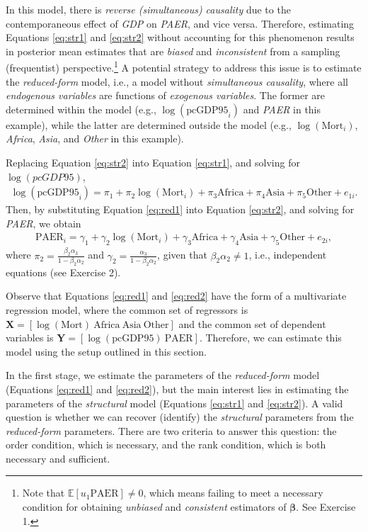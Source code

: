 In this model, there is \textit{reverse (simultaneous) causality} due to the contemporaneous effect of \textit{GDP} on \textit{PAER}, and vice versa. Therefore, estimating Equations \ref{eq:str1} and \ref{eq:str2} without accounting for this phenomenon results in posterior mean estimates that are \textit{biased} and \textit{inconsistent} from a sampling (frequentist) perspective.\footnote{Note that $\mathbb{E}[u_1\text{PAER}]\neq 0$, which means failing to meet a necessary condition for obtaining \textit{unbiased} and \textit{consistent} estimators of $\bm{\beta}$. See Exercise 1.} A potential strategy to address this issue is to estimate the \textit{reduced-form} model, i.e., a model without \textit{simultaneous causality}, where all \textit{endogenous variables} are functions of \textit{exogenous variables}. The former are determined within the model (e.g., $\log(\text{pcGDP95}_i)$ and \textit{PAER} in this example), while the latter are determined outside the model (e.g., $\log(\text{Mort}_i)$, \textit{Africa}, \textit{Asia}, and \textit{Other} in this example).

Replacing Equation \ref{eq:str2} into Equation \ref{eq:str1}, and solving for $\log(\textit{pcGDP95})$,
\begin{align}\label{eq:red1}
	\log(\text{pcGDP95}_i)=\pi_1+\pi_2\log(\text{Mort}_i)+\pi_3 \text{Africa}+\pi_4 \text{Asia}+\pi_5 \text{Other}+e_{1i}.   
\end{align}
Then, by substituting Equation \ref{eq:red1} into Equation \ref{eq:str2}, and solving for \textit{PAER}, we obtain
\begin{align}\label{eq:red2}
	\text{PAER}_i = \gamma_1 + \gamma_2 \log(\text{Mort}_i) + \gamma_3 \text{Africa} + \gamma_4 \text{Asia} + \gamma_5 \text{Other} + e_{2i},
\end{align}
where $\pi_2 = \frac{\beta_2\alpha_3}{1 - \beta_2\alpha_2}$ and $\gamma_2 = \frac{\alpha_3}{1 - \beta_2\alpha_2}$, given that $\beta_2 \alpha_2 \neq 1$, i.e., independent equations (see Exercise 2).

Observe that Equations \ref{eq:red1} and \ref{eq:red2} have the form of a multivariate regression model, where the common set of regressors is $\bm{X} = \left[\log(\text{Mort}) \ \text{Africa} \ \text{Asia} \ \text{Other}\right]$ and the common set of dependent variables is $\bm{Y} = \left[\log(\text{pcGDP95}) \ \text{PAER}\right]$. Therefore, we can estimate this model using the setup outlined in this section.

In the first stage, we estimate the parameters of the \textit{reduced-form} model (Equations \ref{eq:red1} and \ref{eq:red2}), but the main interest lies in estimating the parameters of the \textit{structural} model (Equations \ref{eq:str1} and \ref{eq:str2}). A valid question is whether we can recover (identify) the \textit{structural} parameters from the \textit{reduced-form} parameters. There are two criteria to answer this question: the order condition, which is necessary, and the rank condition, which is both necessary and sufficient.\\
 

